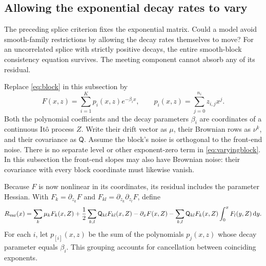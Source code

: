 \subsection{Allowing the exponential decay rates to vary}\label{sec:varyingexponents}
The preceding splice criterion fixes the exponential matrix. Could a model avoid smooth-family restrictions by allowing the decay rates themselves to move? For an uncorrelated splice with strictly positive decays, the entire smooth-block consistency equation survives. The meeting component cannot absorb any of its residual.

Replace \eqref{eq:block} in this subsection by
\begin{equation}\label{eq:varyingblock}
F(x,z)=\sum_{i=1}^K p_i(x,z)e^{-\beta_i x},\qquad
p_i(x,z)=\sum_{j=0}^{n_i}z_{i,j}x^j.
\end{equation}
Both the polynomial coefficients and the decay parameters $\beta_i$ are coordinates of a continuous It\^o process $Z$. Write their drift vector as $\mu$, their Brownian rows as $\nu^k$, and their covariance as $\mathsf Q$. Assume the block's noise is orthogonal to the front-end noise. There is no separate level or other exponent-zero term in \eqref{eq:varyingblock}. In this subsection the front-end slopes may also have Brownian noise: their covariance with every block coordinate must likewise vanish.

Because $F$ is now nonlinear in its coordinates, its residual includes the parameter Hessian. With $F_k=\partial_{z_k}F$ and $F_{kl}=\partial_{z_k}\partial_{z_l}F$, define
\begin{equation}\label{eq:varyingresidual}
R_{\rm var}(x)=\sum_k\mu_kF_k(x,Z)
 +\frac12\sum_{k,l}\mathsf Q_{kl}F_{kl}(x,Z)-\partial_xF(x,Z)
 -\sum_{k,l}\mathsf Q_{kl}F_k(x,Z)\int_0^x F_l(y,Z)\,\mathrm d y.
\end{equation}
For each $i$, let $p_{[i]}(x,z)$ be the sum of the polynomials $p_j(x,z)$ whose decay parameter equals $\beta_i$. This grouping accounts for cancellation between coinciding exponents.

